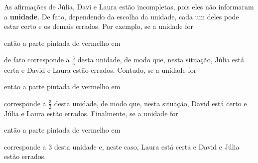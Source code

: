 \begin{atividade}
\solucao
  As afirmações de Júlia, Davi e Laura estão incompletas, pois eles não informaram a   {\bfseries unidade}. De fato, dependendo da escolha da unidade, cada um deles pode estar certo e os demais errados. Por exemplo, se a unidade for
\begin{center}
\end{center}
então a parte pintada de vermelho em
\begin{center}
\end{center}
de fato corresponde a   $\frac{3}{5}$ desta unidade, de modo que, nesta situação, Júlia está certa e David e Laura estão errados. Contudo, se a unidade for
\begin{center}
\end{center}
então a parte pintada de vermelho em
\begin{center}
\end{center}
  corresponde a   $\frac{3}{2}$ desta unidade,  de modo que, nesta situação, David está certo e Júlia e Laura estão errados. Finalmente, se a unidade for
\begin{center}
\end{center}
então a parte pintada de vermelho em
\begin{center}
\end{center}
  corresponde a   $3$ desta unidade e, neste caso, Laura está certa e David e Júlia estão errados.

\end{atividade}

